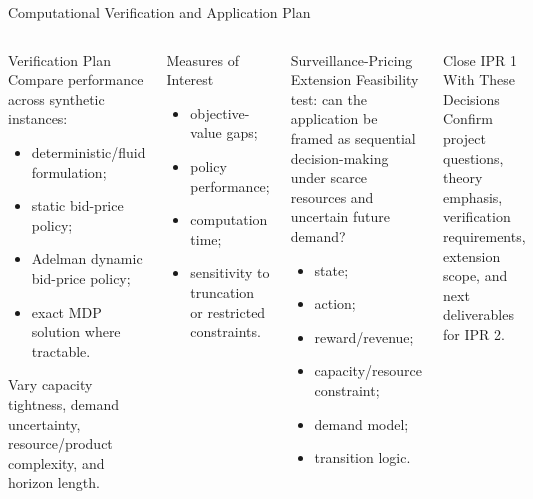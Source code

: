 \documentclass[aspectratio=169,11pt]{beamer}
\begin{document}
\begin{frame}[t]{Computational Verification and Application Plan}
\small
\begin{columns}[T,onlytextwidth]
\begin{block}{Verification Plan}
Compare performance across synthetic instances:
\begin{itemize}
    \item deterministic/fluid formulation;
    \item static bid-price policy;
    \item Adelman dynamic bid-price policy;
    \item exact MDP solution where tractable.
\end{itemize}
Vary capacity tightness, demand uncertainty, resource/product complexity, and horizon length.
\end{block}

\begin{block}{Measures of Interest}
\begin{itemize}
    \item objective-value gaps;
    \item policy performance;
    \item computation time;
    \item sensitivity to truncation or restricted constraints.
\end{itemize}
\end{block}

\begin{block}{Surveillance-Pricing Extension}
Feasibility test: can the application be framed as sequential decision-making under scarce resources and uncertain future demand?
\begin{itemize}
    \item state;
    \item action;
    \item reward/revenue;
    \item capacity/resource constraint;
    \item demand model;
    \item transition logic.
\end{itemize}
\end{block}

\begin{block}{Close IPR 1 With These Decisions}
Confirm project questions, theory emphasis, verification requirements, extension scope, and next deliverables for IPR 2.
\end{block}
\end{columns}
\end{frame}
\end{document}

